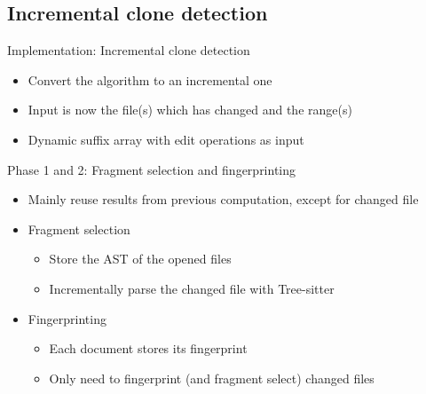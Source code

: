 \documentclass[aspectratio=1610, xcolor=table]{beamer}
\begin{document}
\subsection{Incremental clone detection}
\begin{frame}{Implementation: Incremental clone detection}
    \begin{itemize}
        \item Convert the algorithm to an incremental one
        \item Input is now the file(s) which has changed and the range(s)
        \item Dynamic suffix array with edit operations as input
    \end{itemize}
\end{frame}

\begin{frame}{Phase 1 and 2: Fragment selection and fingerprinting}
    \begin{itemize}
        \item Mainly reuse results from previous computation, except for changed file
        \item Fragment selection
    \begin{itemize}
        \item Store the AST of the opened files
        \item Incrementally parse the changed file with Tree-sitter
    \end{itemize}
\item Fingerprinting
    \begin{itemize}
        \item Each document stores its fingerprint
        \item Only need to fingerprint (and fragment select) changed files
    \end{itemize}
    \end{itemize}
\end{frame}
\end{document}
